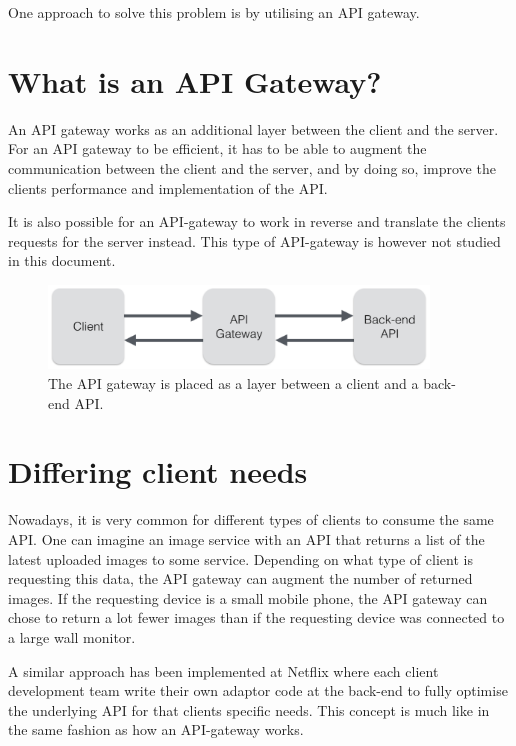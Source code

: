 \documentclass{cslthse-msc}
\begin{document}
One approach to solve this problem is by utilising an API gateway.

\section{What is an API Gateway?}
An API gateway works as an additional layer between the client and the server. For an API gateway to be efficient, it has to be able to augment the communication between the client and the server, and by doing so, improve the clients performance and implementation of the API.

It is also possible for an API-gateway to work in reverse and translate the clients requests for the server instead. This type of API-gateway is however not studied in this document.

\begin{figure}[H]
  \centering
    \begin{center}
      \includegraphics[width=0.9\textwidth]{images/api_gateway.png}
    \end{center}
  \caption{The API gateway is placed as a layer between a client and a back-end API.}
\end{figure}

\section{Differing client needs}
Nowadays, it is very common for different types of clients to consume the same API. One can imagine an image service with an API that returns a list of the latest uploaded images to some service. Depending on what type of client is requesting this data, the API gateway can augment the number of returned images. If the requesting device is a small mobile phone, the API gateway can chose to return a lot fewer images than if the requesting device was connected to a large wall monitor.

A similar approach has been implemented at Netflix where each client development team write their own adaptor code at the back-end to fully optimise the underlying API for that clients specific needs\cite{netflix}. This concept is much like in the same fashion as how an API-gateway works.
\end{document}
